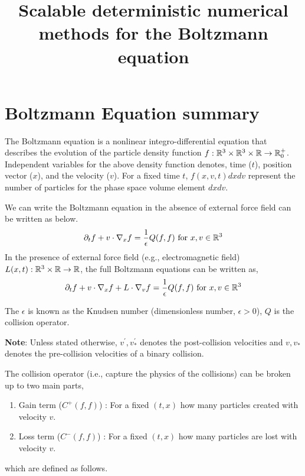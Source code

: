\documentclass{article}
\title{Scalable deterministic numerical methods for the Boltzmann equation}
\begin{document}
\maketitle

\section{Boltzmann Equation summary}
The Boltzmann equation is a nonlinear integro-differential equation that describes the evolution of the particle density function $f : \mathbb{R}^3 \times \mathbb{R}^3 \times \mathbb{R} \rightarrow \mathbb{R}^{+}_0$. Independent variables for the above density function denotes, time ($t$), position vector ($x$), and the velocity ($v$). For a fixed time $t$, $f(x,v,t)dx dv$ represent the number of particles for the phase space volume element $dxdv$. 

We can write the Boltzmann equation in the absence of external force field can be written as below. 
\begin{equation}
    \partial_t f + v\cdot \nabla_x f = \frac{1}{\epsilon}Q(f,f) \text{ for } x,v \in \mathbb{R}^3 \label{eq:be}
\end{equation}
In the presence of external force field (e.g., electromagnetic field) $L(x,t) : \mathbb{R}^3 \times \mathbb{R} \rightarrow \mathbb{R}$, the full Boltzmann equations can be written as, 
\begin{equation}
    \partial_t f + v\cdot \nabla_x f  + L \cdot \nabla_v f = \frac{1}{\epsilon}Q(f,f) \text{ for } x,v \in \mathbb{R}^3 \label{eq:be_full}
\end{equation}

The $\epsilon$ is known as the Knudsen number (dimensionless number, $\epsilon > 0$), $Q$ is the collision operator. 

\textbf{Note}: Unless stated otherwise, $v^\prime,v_*^\prime$ denotes the post-collision velocities and $v,v_*$ denotes the pre-collision velocities of a binary collision.

The collision operator (i.e., capture the physics of the collisions) can be broken up to two main parts, 
\begin{enumerate}
    \item Gain term ($C^+(f,f)$) : For a fixed $(t,x)$ how many particles created with velocity $v$.
    \item Loss term ($C^-(f,f)$) : For a fixed $(t,x)$ how many particles are lost with velocity $v$.
\end{enumerate} which are defined as follows. 
\end{document}
